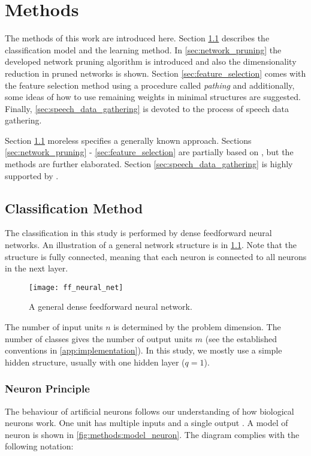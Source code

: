 \chapter{Methods} \label{chap:methods}
The methods of this work are introduced here. Section \ref{sec:classification_method} describes the classification model and the learning method. In \cref{sec:network_pruning} the developed network pruning algorithm is introduced and also the dimensionality reduction in pruned networks is shown. Section \ref{sec:feature_selection} comes with the feature selection method using a procedure called \textit{pathing} and additionally, some ideas of how to use remaining weights in minimal structures are suggested. Finally, \cref{sec:speech_data_gathering} is devoted to the process of speech data gathering.

Section \ref{sec:classification_method} moreless specifies a generally known approach. Sections \ref{sec:network_pruning} - \ref{sec:feature_selection} are partially based on \citep{bulin_2016}, but the methods are further elaborated. Section \ref{sec:speech_data_gathering} is highly supported by \citep{smidl_pc}.

\section{Classification Method} \label{sec:classification_method}
The classification in this study is performed by dense feedforward neural networks. An illustration of a general network structure is in \cref{fig:methods:ff_neural_net}. Note that the structure is fully connected, meaning that each neuron is connected to all neurons in the next layer.

\begin{figure}[H]
\centering
\texttt{[image: ff\_neural\_net]}
\caption{A general dense feedforward neural network.}
\label{fig:methods:ff_neural_net}
\end{figure}

The number of input units $ n $ is determined by the problem dimension. The number of classes gives the number of output units $ m $ (see the established conventions in \cref{app:implementation}). In this study, we mostly use a simple hidden structure, usually with one hidden layer ($ q = 1 $).

\subsection*{Neuron Principle}
The behaviour of artificial neurons follows our understanding of how biological neurons work. One unit has multiple inputs and a single output \citep{article:perceptron}. A model of neuron is shown in \cref{fig:methods:model_neuron}. The diagram complies with the following notation:

